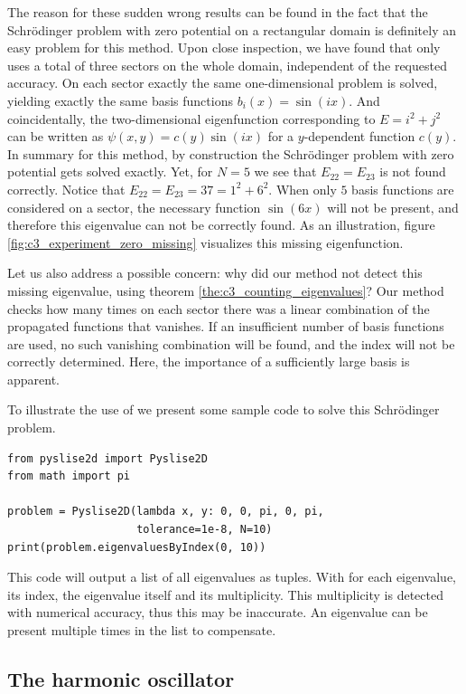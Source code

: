The reason for these sudden wrong results can be found in the fact that the Schrödinger problem with zero potential on a rectangular domain is definitely an easy problem for this method. Upon close inspection, we have found that \pyslisetd{} only uses a total of three sectors on the whole domain, independent of the requested accuracy. On each sector exactly the same one-dimensional problem is solved, yielding exactly the same basis functions $b_i(x) = \sin(i x)$. And coincidentally, the two-dimensional eigenfunction corresponding to $E = i^2 + j^2$ can be written as $\psi(x, y) = c(y) \sin(i x)$ for a $y$-dependent function $c(y)$. In summary for this method, by construction the Schrödinger problem with zero potential gets solved exactly. Yet, for $N=5$ we see that $E_{22} = E_{23}$ is not found correctly. Notice that $E_{22} = E_{23} = 37 = 1^2 + 6^2$. When only $5$ basis functions are considered on a sector, the necessary function $\sin(6 x)$ will not be present, and therefore this eigenvalue can not be correctly found. As an illustration, figure \ref{fig:c3_experiment_zero_missing} visualizes this missing eigenfunction.

Let us also address a possible concern: why did our method not detect this missing eigenvalue, using theorem \ref{the:c3_counting_eigenvalues}? Our method checks how many times on each sector there was a linear combination of the propagated functions that vanishes. If an insufficient number of basis functions are used, no such vanishing combination will be found, and the index will not be correctly determined. Here, the importance of a sufficiently large basis is apparent.

To illustrate the use of \pyslisetd{} we present some sample code to solve this Schrödinger problem.
\begin{verbatim}
from pyslise2d import Pyslise2D
from math import pi

problem = Pyslise2D(lambda x, y: 0, 0, pi, 0, pi,
                    tolerance=1e-8, N=10)
print(problem.eigenvaluesByIndex(0, 10))
\end{verbatim}
This code will output a list of all eigenvalues as tuples. With for each eigenvalue, its index, the eigenvalue itself and its multiplicity. This multiplicity is detected with numerical accuracy, thus this may be inaccurate. An eigenvalue can be present multiple times in the list to compensate.


\subsection{The harmonic oscillator}\label{sec:c3_experiment_harmonic}

